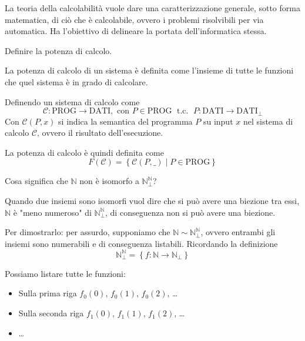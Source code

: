 \documentclass[12pt, answers]{exam}
\theoremstyle{plain}
\newcommand{\tc}{\; \text{ t.c. } \;}
\newcommand{\dati}{\text{DATI}}
\newcommand{\prog}{\text{PROG}}
\newcommand{\C}{\mathcal{C}}
\newcommand{\N}{\mathbb{N}}
\begin{document}
\begin{questions}
\begin{solution}
            La teoria della calcolabilità vuole dare una caratterizzazione generale, sotto forma matematica, di ciò che è calcolabile, ovvero i problemi risolvibili per via automatica. Ha l'obiettivo di delineare la portata dell'informatica stessa.
        \end{solution}
        
        \question Definire la potenza di calcolo.
        
        \begin{solution}
            La potenza di calcolo di un sistema è definita come l'insieme di tutte le funzioni che quel sistema è in grado di calcolare.
            
            Definendo un sistema di calcolo come 
            $$ \C: \prog \rightarrow \dati, \text{ con } P \in \prog \tc P: \dati \rightarrow \dati_\bot $$
            Con $\C(P,x)$ si indica la semantica del programma $P$ su input $x$ nel sistema di calcolo $\C$, ovvero il risultato dell'esecuzione.
            
            La potenza di calcolo è quindi definita come
            $$ F(\C) = \left\{\C(P, \_) \mid P \in \prog \right\} $$
        \end{solution}
        
        \question Cosa significa che $\N$ non è isomorfo a $\N_\bot^\N$?
        
        \begin{solution}
            Quando due insiemi sono isomorfi vuol dire che si può avere una biezione tra essi, $\N$ è "meno numeroso" di $\N_\bot^\N$, di conseguenza non si può avere una biezione.
            
            Per dimostrarlo: per assurdo, supponiamo che $\N \sim \N_\bot^\N$, ovvero entrambi gli insiemi sono numerabili e di conseguenza listabili. Ricordando la definizione
            $$ \N_\bot^\N = \left\{f: \N \rightarrow \N_\bot \right\} $$
            
            Possiamo listare tutte le funzioni: 
            \begin{itemize}
                \item Sulla prima riga $f_0(0)$, $f_0(1)$, $f_0(2)$, \dots
                
                \item Sulla seconda riga $f_1(0)$, $f_1(1)$, $f_1(2)$, \dots
                
                \item \dots
            \end{itemize}
            

\end{solution}
\end{questions}
\end{document}
